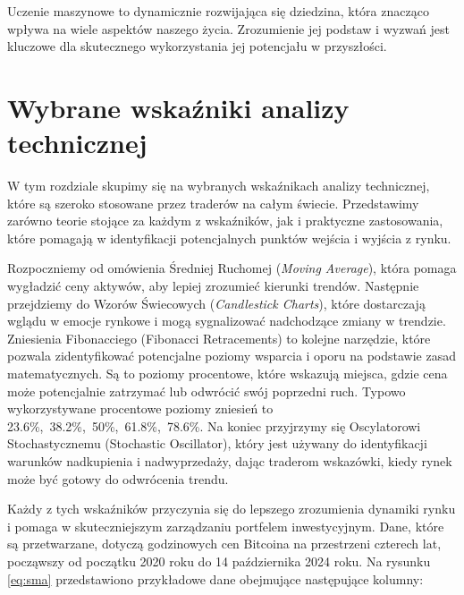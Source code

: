\documentclass[12pt,a4paper,twoside, inzynierska]{pwr_wmat_praca_dyplomowa}
\theoremstyle{plain}
\numberwithin{theorem}{chapter}
\theoremstyle{definition}
\numberwithin{theorem}{chapter}
\begin{document}
	Uczenie maszynowe to dynamicznie rozwijająca się dziedzina, która znacząco wpływa na wiele aspektów naszego życia. Zrozumienie jej podstaw i wyzwań jest kluczowe dla skutecznego wykorzystania jej potencjału w przyszłości. 
	
	\chapter{Wybrane wskaźniki analizy technicznej}
	W tym rozdziale skupimy się na wybranych wskaźnikach analizy technicznej, które są szeroko stosowane przez traderów na całym świecie. Przedstawimy zarówno teorie stojące za każdym z wskaźników, jak i praktyczne zastosowania, które pomagają w identyfikacji potencjalnych punktów wejścia i wyjścia z rynku.
	
	Rozpoczniemy od omówienia Średniej Ruchomej (\textit{Moving Average}), która pomaga wygładzić ceny aktywów, aby lepiej zrozumieć kierunki trendów. Następnie przejdziemy do Wzorów Świecowych (\textit{Candlestick Charts}), które dostarczają wglądu w emocje rynkowe i mogą sygnalizować nadchodzące zmiany w trendzie. Zniesienia Fibonacciego (Fibonacci Retracements) to kolejne narzędzie, które pozwala zidentyfikować potencjalne poziomy wsparcia i oporu na podstawie zasad matematycznych. Są to poziomy procentowe, które wskazują miejsca, gdzie cena może potencjalnie zatrzymać lub odwrócić swój poprzedni ruch. Typowo wykorzystywane procentowe poziomy zniesień to 23.6\%,\ 38.2\%,\ 50\%,\ 61.8\%,\ 78.6\%. Na koniec przyjrzymy się Oscylatorowi Stochastycznemu (Stochastic Oscillator), który jest używany do identyfikacji warunków nadkupienia i nadwyprzedaży, dając traderom wskazówki, kiedy rynek może być gotowy do odwrócenia trendu.
	
	Każdy z tych wskaźników przyczynia się do lepszego zrozumienia dynamiki rynku i pomaga w skuteczniejszym zarządzaniu portfelem inwestycyjnym. Dane, które są przetwarzane, dotyczą godzinowych cen Bitcoina na przestrzeni czterech lat, począwszy od początku 2020 roku do 14 października 2024 roku. Na rysunku \ref{eq:sma} przedstawiono przykładowe dane obejmujące następujące kolumny:
		\vspace{12pt} %
	
\end{document}
